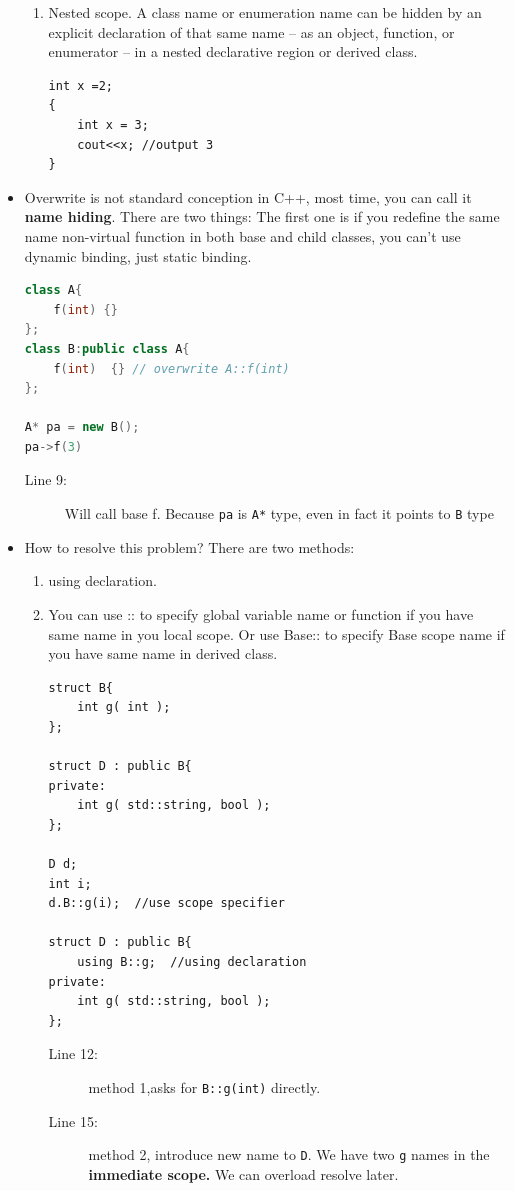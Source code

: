 \documentclass[a4paper,11pt,twoside]{book}
\begin{document}
\begin{itemize}
\begin{enumerate}
		\item Nested scope. A class name or enumeration name can be hidden by an explicit declaration of that same name -- as an object, function, or enumerator -- in a nested declarative region or derived class.
\begin{lstlisting}[numbers=none]
int x =2;
{
	int x = 3; 
	cout<<x; //output 3
}
\end{lstlisting}
		
	\end{enumerate}
	
	\item Overwrite is not standard conception in C++, most time, you can call it \textbf{name hiding}. There are two things: The first one is if you redefine the same name non-virtual function in both base and child classes, you can't use dynamic binding, just static binding. 
\begin{lstlisting}[frame=single, language=c++]
class A{
	f(int) {}
};
class B:public class A{
	f(int)  {} // overwrite A::f(int)
};
	
A* pa = new B();
pa->f(3) 
\end{lstlisting}
\begin{description}
	\item[Line 9:] Will call base f. Because \texttt{pa} is \texttt{A*} type, even in fact it points to \texttt{B} type
\end{description}


	
	\item How to resolve this problem?  There are two methods:
	\begin{enumerate}
		\item using declaration.
		
		\item You can use :: to specify global variable name or function if you have same name in you local scope.  Or use Base:: to specify Base scope name if you have same name in derived class.
\begin{lstlisting}
struct B{
	int g( int );
};

struct D : public B{
private:
	int g( std::string, bool );
};

D d; 
int i;
d.B::g(i);  //use scope specifier 
		
struct D : public B{ 
	using B::g;  //using declaration
private:
	int g( std::string, bool );
};
\end{lstlisting}
\begin{description}
	\item[Line 12:] method 1,asks for \texttt{B::g(int)} directly.
	\item[Line 15:] method 2, introduce new name to \texttt{D}. We have two \texttt{g} names in the \textbf{immediate scope.} We can overload resolve later.
\end{description}
		

\end{enumerate}
\end{itemize}
\end{document}
